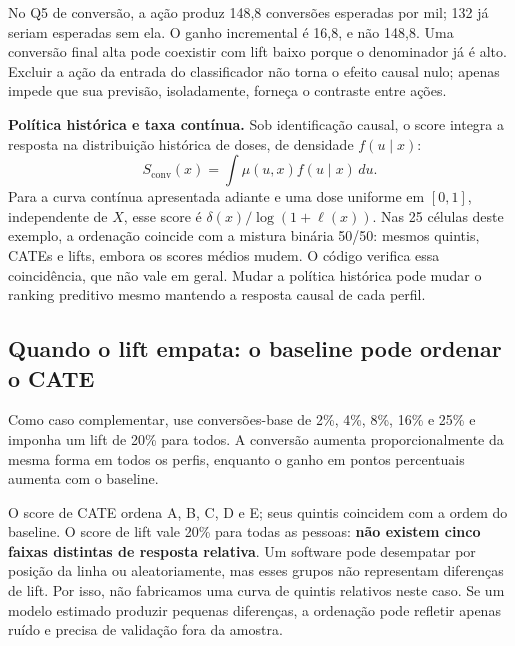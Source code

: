 \begin{table}[H]
\centering\small
\caption{Se só pudermos selecionar 1\,000 pessoas: comparação dos três Q5.}
\label{tab:quantile_top}

\end{table}

No Q5 de conversão, a ação produz 148,8 conversões esperadas por mil; 132 já seriam esperadas sem ela. O ganho incremental é 16,8, e não 148,8. Uma conversão final alta pode coexistir com lift baixo porque o denominador já é alto. Excluir a ação da entrada do classificador não torna o efeito causal nulo; apenas impede que sua previsão, isoladamente, forneça o contraste entre ações.

\noindent\textbf{Política histórica e taxa contínua.} Sob identificação causal, o score integra a resposta na distribuição histórica de doses, de densidade $f(u\mid x)$:
\[
S_{\mathrm{conv}}(x)=\int\mu(u,x)f(u\mid x)\,du.
\]
Para a curva contínua apresentada adiante e uma dose uniforme em $[0,1]$, independente de $X$, esse score é $\delta(x)/\log(1+\ell(x))$. Nas 25 células deste exemplo, a ordenação coincide com a mistura binária 50/50: mesmos quintis, CATEs e lifts, embora os scores médios mudem. O código verifica essa coincidência, que não vale em geral. Mudar a política histórica pode mudar o ranking preditivo mesmo mantendo a resposta causal de cada perfil.

\clearpage
\subsection{Quando o lift empata: o baseline pode ordenar o CATE}
Como caso complementar, use conversões-base de 2\%, 4\%, 8\%, 16\% e 25\% e imponha um lift de 20\% para todos. A conversão aumenta proporcionalmente da mesma forma em todos os perfis, enquanto o ganho em pontos percentuais aumenta com o baseline.

\begin{table}[H]
\centering\small
\caption{Resposta relativa constante: todos têm o mesmo lift.}
\label{tab:quantile_constant}

\end{table}

O score de CATE ordena A, B, C, D e E; seus quintis coincidem com a ordem do baseline. O score de lift vale 20\% para todas as pessoas: \textbf{não existem cinco faixas distintas de resposta relativa}. Um software pode desempatar por posição da linha ou aleatoriamente, mas esses grupos não representam diferenças de lift. Por isso, não fabricamos uma curva de quintis relativos neste caso. Se um modelo estimado produzir pequenas diferenças, a ordenação pode refletir apenas ruído e precisa de validação fora da amostra.

